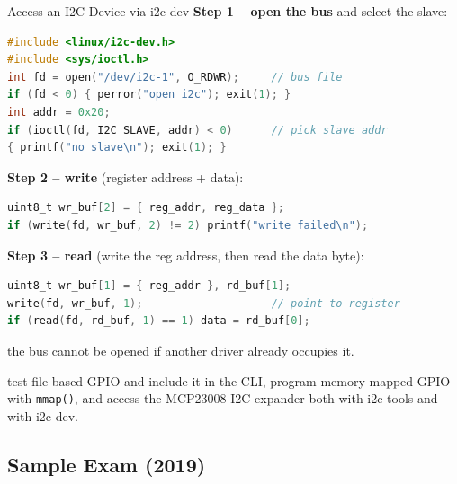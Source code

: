 \begin{KR}{Access an I2C Device via i2c-dev}
    \textbf{Step 1 -- open the bus} and select the slave:
\begin{lstlisting}[language=C, style=basesmol, aboveskip=2pt, belowskip=2pt]
#include <linux/i2c-dev.h>
#include <sys/ioctl.h>
int fd = open("/dev/i2c-1", O_RDWR);     // bus file
if (fd < 0) { perror("open i2c"); exit(1); }
int addr = 0x20;
if (ioctl(fd, I2C_SLAVE, addr) < 0)      // pick slave addr
{ printf("no slave\n"); exit(1); }
\end{lstlisting}
    \textbf{Step 2 -- write} (register address + data):
\begin{lstlisting}[language=C, style=basesmol, aboveskip=2pt, belowskip=2pt]
uint8_t wr_buf[2] = { reg_addr, reg_data };
if (write(fd, wr_buf, 2) != 2) printf("write failed\n");
\end{lstlisting}
    \textbf{Step 3 -- read} (write the reg address, then read the data byte):
\begin{lstlisting}[language=C, style=basesmol, aboveskip=2pt, belowskip=2pt]
uint8_t wr_buf[1] = { reg_addr }, rd_buf[1];
write(fd, wr_buf, 1);                    // point to register
if (read(fd, rd_buf, 1) == 1) data = rd_buf[0];
\end{lstlisting}
     the bus cannot be opened if another driver already occupies it.
\end{KR}

\begin{remark}
     test file-based GPIO and include it in the CLI,
    program memory-mapped GPIO with \texttt{mmap()}, and access the MCP23008 I2C
    expander both with i2c-tools and with i2c-dev.
\end{remark}

\subsection{Sample Exam (2019)}

